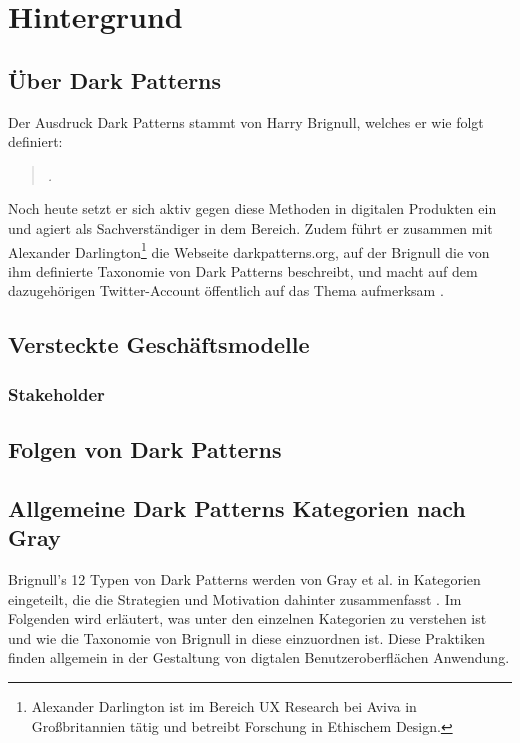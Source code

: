 \documentclass[a4paper]{article}
\begin{document}
\section{Hintergrund}
\label{sec:hintergrund}


\subsection{Über Dark Patterns} 
\label{sub:die_hintergruende_der_dark_patterns}
Der Ausdruck Dark Patterns stammt von Harry Brignull, welches er wie folgt definiert:
\begin{quote}
\textit{.}
\end{quote}

Noch heute setzt er sich aktiv gegen diese Methoden in digitalen Produkten ein und agiert als Sachverständiger in dem Bereich. Zudem führt er zusammen mit Alexander Darlington\footnote{\label{foot:2} Alexander Darlington ist im Bereich UX Research bei Aviva in Großbritannien tätig und betreibt Forschung in Ethischem Design.} die Webseite darkpatterns.org, auf der Brignull die von ihm definierte Taxonomie von Dark Patterns beschreibt, und macht auf dem dazugehörigen Twitter-Account öffentlich auf das Thema aufmerksam \cite{brignull3}\cite{brignull4}. 

\subsection{Versteckte Geschäftsmodelle} 
\label{sub:versteckte_geschaeftsmodelle}


\subsubsection{Stakeholder}
\label{sub:stakeholder}


\subsection{Folgen von Dark Patterns} 
\label{sub:zielgruppen_der_dark_patterns}


\subsection{Allgemeine Dark Patterns Kategorien nach Gray}
\label{sub:dark_patterns_kategorien}
Brignull's 12 Typen von Dark Patterns werden von Gray et al. in Kategorien eingeteilt, die die Strategien und Motivation dahinter zusammenfasst \cite{gray}. 
Im Folgenden wird erläutert, was unter den einzelnen Kategorien zu verstehen ist und wie die Taxonomie von Brignull in diese einzuordnen ist. Diese Praktiken finden allgemein in der Gestaltung von digtalen Benutzeroberflächen Anwendung.
\end{document}
